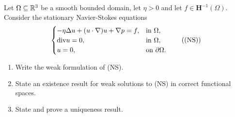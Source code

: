 \newpage
\begin{exercise}
    Let \(\Omega \subseteq \mathbb{R}^3\) be a smooth bounded domain, let \(\eta > 0\) and let \(f \in \bm{H}^{-1}(\Omega)\). Consider the stationary Navier-Stokes equations
    \begin{equation*}
        \begin{cases}
            -\eta \Delta u + (u \cdot \nabla) u + \nabla p = f, & \text{in } \Omega,          \\
            \text{div} u = 0,                                       & \text{in } \Omega,          \\
            u = 0,                                            & \text{on } \partial \Omega.
        \end{cases}
        \tag{(NS)}
    \end{equation*}
    \begin{enumerate}
        \item Write the weak formulation of (NS).
        \item State an existence result for weak solutions to (NS) in correct functional
              spaces.
        \item State and prove a uniqueness result.
    \end{enumerate}
\end{exercise}
